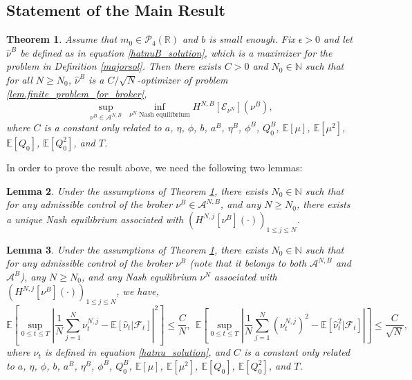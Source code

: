 \documentclass[10pt]{article}
\newtheorem{theorem}{Theorem}[section]
\newtheorem{lemma}[theorem]{Lemma}
\begin{document}
\subsection{Statement of the Main Result}

\begin{theorem}\label{thm.finite_1}
Assume that $m_0 \in \mathcal{P}_4(\mathbb{R})$ and $b$ is small enough. Fix $\epsilon > 0$ and let $\hat{\nu}^B$ be defined as in equation \eqref{hatnuB_solution}, which is a maximizer for the problem in Definition \ref{majorsol}. 
Then there exists $C>0$ and $N_0 \in \mathbb{N}$ such that for all $N \geq N_0$, $\hat{\nu}^B$ is a $C/\sqrt{N}$-optimizer of problem \eqref{lem.finite_problem_for_broker},
$$\underset{\nu^B \in \mathcal{A}^{N,B}}{\sup} ~\underset{\nu^N \text{~Nash equilibrium}}{\inf} H^{N,B}\left[\mathcal{E}_{\nu^N}\right]\left(\nu^B\right),$$
where $C$ is a constant only related to $a$, $\eta$, $\phi$, $b$, $a^B$, $\eta^B$, $\phi^B$, $Q_0^B$, $\mathbb{E}[\mu]$, $\mathbb{E}[\mu^2]$, $\mathbb{E}[Q_0]$, $\mathbb{E}[Q_0^2]$, and $T$.
\end{theorem}
In order to prove the result above, we need the following two lemmas:

\begin{lemma}\label{lem.finite_2}
Under the assumptions of Theorem \ref{thm.finite_1}, there exists $N_0 \in \mathbb{N}$ such that for any admissible control of the broker $\nu^B \in \mathcal{A}^{N,B}$, and any $N \geq N_0$, there exists a unique Nash equilibrium associated with $(H^{N,j}[\nu^B](\cdot))_{1 \leq j \leq N}$.
\end{lemma}
\begin{lemma}\label{lem.finite_3}
Under the assumptions of Theorem \ref{thm.finite_1}, there exists $N_0 \in \mathbb{N}$ such that for any admissible control of the broker $\nu^B$ 
(note that it belongs to both $\mathcal{A}^{N,B}$ and $\mathcal{A}^B$), any $N \geq N_0$, and any Nash equilibrium $\nu^N$ associated with $(H^{N,j}[\nu^B](\cdot))_{1 \leq j \leq N}$, we have,
\begin{equation}\label{difference_between_hatnu_and_empirical_nu}
    \mathbb{E} \left[ \underset{0 \leq t \leq T}{\sup} \left| \frac{1}{N} \sum_{j=1}^{N} \nu_t^{N,j} - \mathbb{E}[\hat{\nu}_t | \mathcal{F}_t] \right|^2 \right] \leq \frac{C}{N},~~
    \mathbb{E} \left[ \underset{0 \leq t \leq T}{\sup} \left| \frac{1}{N} \sum_{j=1}^{N} \left(\nu_t^{N,j}\right)^2 - \mathbb{E}[\hat{\nu}_t^2 | \mathcal{F}_t] \right| \right] \leq \frac{C}{\sqrt{N}},
\end{equation}
where $\hat{\nu}_t$ is defined in equation \eqref{hatnu_solution}, and $C$ is a constant only related to $a$, $\eta$, $\phi$, $b$, $a^B$, $\eta^B$, $\phi^B$, $Q_0^B$, $\mathbb{E}[\mu]$, $\mathbb{E}[\mu^2]$, $\mathbb{E}[Q_0]$, $\mathbb{E}[Q_0^2]$, and $T$.
\end{lemma}
\end{document}
